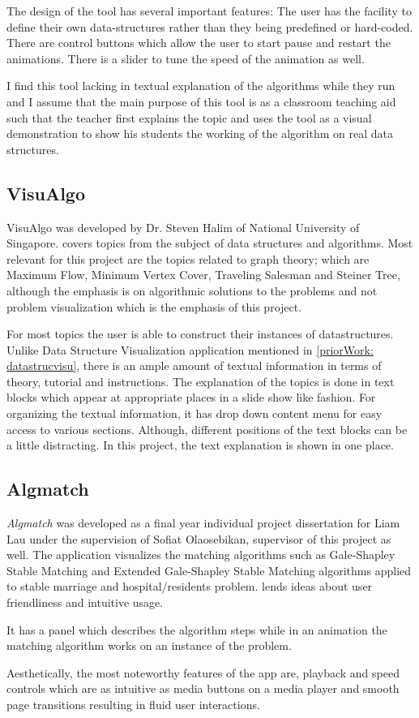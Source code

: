 The design of the tool has several important features: The user has the
facility to define their own data-structures rather than they being predefined or
hard-coded. There are control buttons which allow the user to start pause and
restart the animations. There is a slider to tune the speed of the animation as
well.

I find this tool lacking in textual explanation of the algorithms while they run and I assume that the main purpose of this tool is as a classroom teaching aid such that the
teacher first explains the topic and uses the tool as a visual demonstration to
show his students the working of the algorithm on real data structures.

\subsection{VisuAlgo}
\label{priorWork: visualgo}
VisuAlgo was developed by Dr. Steven Halim of National University of
Singapore. \cite{HalimVisu} covers topics from the
subject of data structures and algorithms. Most relevant for this project are
the topics related to graph theory; which are Maximum Flow, Minimum Vertex
Cover, Traveling Salesman and Steiner Tree, although the emphasis is on
algorithmic solutions to the problems and not problem visualization which is
the emphasis of this project.

For most topics the user is able to construct their instances of datastructures.
Unlike Data Structure Visualization application mentioned in
\autoref{priorWork: datastrucvisu}, there is an ample amount of textual
information in terms of theory, tutorial and instructions. The explanation of
the topics is done in text blocks which appear at appropriate places in a slide
show like fashion. For organizing the textual information, it has drop down
content menu for easy access to various sections. Although, different positions
of the text blocks can be a little distracting. In this project, the text explanation
is shown in one place.


\subsection{Algmatch}
\label{priorWork: algmatch}
\emph{Algmatch} was developed as a final year individual project dissertation for
Liam Lau under the supervision of Sofiat Olaosebikan, supervisor of this project as well. The application
visualizes the matching algorithms such as Gale-Shapley Stable Matching and
Extended Gale-Shapley Stable Matching algorithms applied to stable marriage and
hospital/residents problem. \cite{LiamApp}
lends ideas about user friendliness and intuitive usage.

It has a panel which describes the algorithm steps while in an animation the
matching algorithm works on an instance of the problem.

Aesthetically, the most noteworthy features of the app are, playback and speed
controls which are as intuitive as media buttons on a media player and smooth
page transitions resulting in fluid user interactions.
